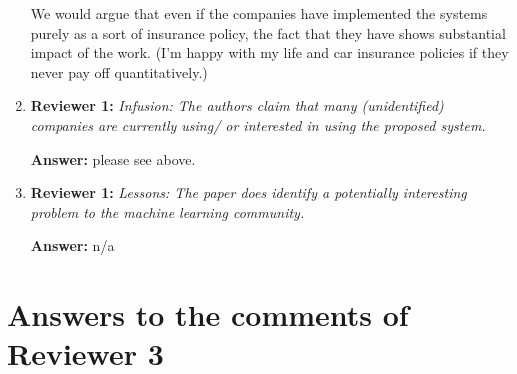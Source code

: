 \documentclass[letterpaper]{article}
\begin{document}
\begin{enumerate}
We would argue that even if the companies have implemented the systems purely as a sort of insurance policy, the fact that they have shows substantial impact of the work.  (I'm happy with my life and car insurance policies if they never pay off quantitatively.)  


\item \textbf{Reviewer 1:} \emph{Infusion: The authors claim that many (unidentified) companies are currently using/ or interested in using  the proposed system.}

\textbf{Answer:} please see above.

\item \textbf{Reviewer 1:} \emph{Lessons: The paper does identify a potentially interesting problem to the machine learning community.}

\textbf{Answer:} n/a


\end{enumerate}



\section{Answers to the comments of Reviewer 3} \label{sec:reviewer3}
\end{document}

